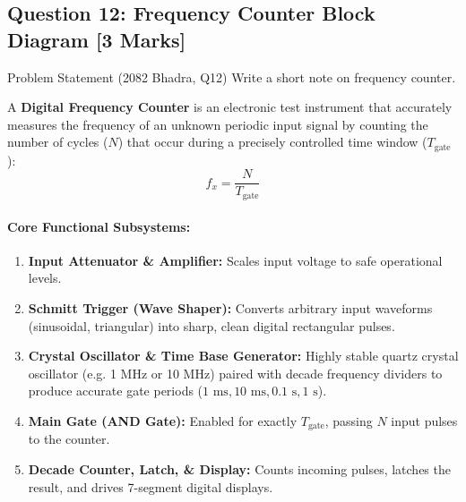\documentclass[11pt,a4paper,oneside]{book}
\begin{document}
\subsection{Question 12: Frequency Counter Block Diagram [3 Marks]}
\begin{questionbox}{Problem Statement (2082 Bhadra, Q12)}
Write a short note on frequency counter.
\end{questionbox}

A \textbf{Digital Frequency Counter} is an electronic test instrument that accurately measures the frequency of an unknown periodic input signal by counting the number of cycles ($N$) that occur during a precisely controlled time window ($T_{\text{gate}}$):
\[
f_x = \frac{N}{T_{\text{gate}}}
\]

\paragraph{Core Functional Subsystems:}
\begin{enumerate}
  \item \textbf{Input Attenuator \& Amplifier:} Scales input voltage to safe operational levels.
  \item \textbf{Schmitt Trigger (Wave Shaper):} Converts arbitrary input waveforms (sinusoidal, triangular) into sharp, clean digital rectangular pulses.
  \item \textbf{Crystal Oscillator \& Time Base Generator:} Highly stable quartz crystal oscillator (e.g. 1 MHz or 10 MHz) paired with decade frequency dividers to produce accurate gate periods ($1\text{ ms}, 10\text{ ms}, 0.1\text{ s}, 1\text{ s}$).
  \item \textbf{Main Gate (AND Gate):} Enabled for exactly $T_{\text{gate}}$, passing $N$ input pulses to the counter.
  \item \textbf{Decade Counter, Latch, \& Display:} Counts incoming pulses, latches the result, and drives 7-segment digital displays.
\end{enumerate}
\end{document}
